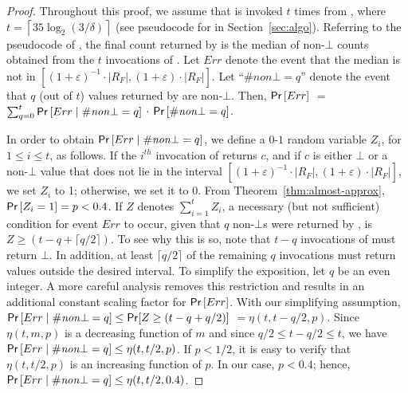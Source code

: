 \begin{proof}
Throughout this proof, we assume that {\ApproxMCCore} is invoked $t$
times from {\ApproxMC}, where $t = \left\lceil 35\log_2 (3/\delta)
\right\rceil$ (see pseudocode for {\ComputeIterCount} in
Section~\ref{sec:algo}).  Referring to the pseudocode of {\ApproxMC},
the final count returned by {\ApproxMC} is the median of non-$\bot$
counts obtained from the $t$ invocations of {\ApproxMCCore}.  Let
$Err$ denote the event that the median is not in
$\left[(1+\varepsilon)^{-1}\cdot |R_F|, (1+\varepsilon)\cdot |R_F|\right]$.  Let
``$\#\mathit{non }\bot = q$'' denote the event that $q$ (out of $t$)
values returned by {\ApproxMCCore} are non-$\bot$.  Then,
$\mathsf{Pr}\left[Err\right]$ $=$ $\sum_{q=0}^t \mathsf{Pr}\left[Err \mid
  \#\mathit{non }\bot = q\right]$ $\cdot$
$\mathsf{Pr}\left[\#\mathit{non }\bot = q\right]$.

In order to obtain $\mathsf{Pr}\left[Err \mid \#\mathit{non }\bot =
  q\right]$, we define a $0$-$1$ random variable $Z_i$, for $1 \le i
\le t$, as follows.  If the $i^{th}$ invocation of {\ApproxMCCore}
returns $c$, and if $c$ is either $\bot$ or a non-$\bot$ value that
does not lie in the interval $[(1+\varepsilon)^{-1}\cdot |R_F|,
  (1+\varepsilon)\cdot |R_F|]$, we set $Z_i$ to 1; otherwise, we set
it to $0$.  From Theorem~\ref{thm:almost-approx}, $\mathsf{Pr}\left[Z_i =
  1\right] = p < 0.4$.  If $Z$ denotes $\sum_{i=1}^t Z_i$, a necessary
(but not sufficient) condition for event $Err$ to occur, given that
$q$ non-$\bot$s were returned by {\ApproxMCCore}, is $Z \ge
(t-q+\lceil q/2\rceil)$.  To see why this is so, note that $t-q$
invocations of {\ApproxMCCore} must return $\bot$.  In addition, at
least $\lceil q/2 \rceil$ of the remaining $q$ invocations must return
values outside the desired interval. To simplify the exposition, let
$q$ be an even integer.  A more careful analysis removes this
restriction and results in an additional constant scaling factor for
$\mathsf{Pr}\left[Err\right]$.  With our simplifying assumption,
$\mathsf{Pr}\left[Err \mid \#\mathit{non }\bot = q\right] \le \mathsf{Pr}[Z \ge (t
  - q + q/2)]$ $=\eta(t, t-q/2, p)$.  Since $\eta(t, m, p)$ is a
decreasing function of $m$ and since $q/2 \le t-q/2 \le t$, we have
$\mathsf{Pr}\left[Err \mid \#\mathit{non }\bot = q\right] \le \eta(t, t/2,
p)$.  If $p < 1/2$, it is easy to verify that $\eta(t, t/2, p)$ is an
increasing function of $p$.  In our case, $p < 0.4$; hence,
$\mathsf{Pr}\left[Err \mid \#\mathit{non }\bot = q\right] \le \eta(t, t/2,
0.4)$.


\end{proof}
